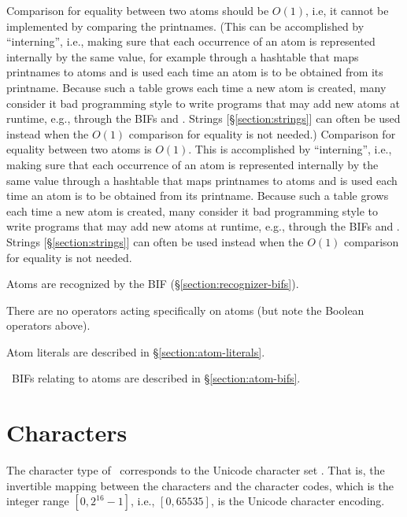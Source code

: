 \ifStd
Comparison for equality between two atoms should be $O(1)$, i.e, it
cannot be implemented by comparing the printnames.  (This can be
accomplished by ``interning'', i.e., making sure
that each occurrence of an atom is represented internally by the same
value, for example through a hashtable that maps printnames to atoms
and is used each time an atom is to be obtained from its printname.
Because such a table grows each time a new atom is created, many
consider it bad programming style to write programs that may add new
atoms at runtime, e.g., through the BIFs  and
.  Strings
[\S\ref{section:strings}] can often be used instead when the $O(1)$
comparison for equality is not needed.)
\else
Comparison for equality between two atoms is $O(1)$.  This is
accomplished by ``interning'', i.e., making sure
that each occurrence of an atom is represented internally by the same
value through a hashtable that maps printnames to atoms and is used
each time an atom is to be obtained from its printname.  Because such
a table grows each time a new atom is created, many consider it bad
programming style to write programs that may add new atoms at runtime,
e.g., through the BIFs  and .
Strings [\S\ref{section:strings}]
can often be used instead when the $O(1)$ comparison for equality is
not needed.
\fi

Atoms are recognized by the BIF
\ifStd {} \else {} \fi (\S\ref{section:recognizer-bifs}).

There are no operators acting specifically on atoms (but note the
Boolean operators above).

Atom literals are described in \S\ref{section:atom-literals}.

\Erlang\ BIFs relating to atoms are described in \S\ref{section:atom-bifs}.


\ifStd
\section{Characters}

\label{section:chars}

The character type of \StdErlang\ corresponds to the Unicode character
set \cite{unicode}.  That is, the invertible mapping between the
characters and the character codes, which is the integer range
$[0,2^{16}-1]$, i.e., $[0,65535]$, is the Unicode character encoding.

